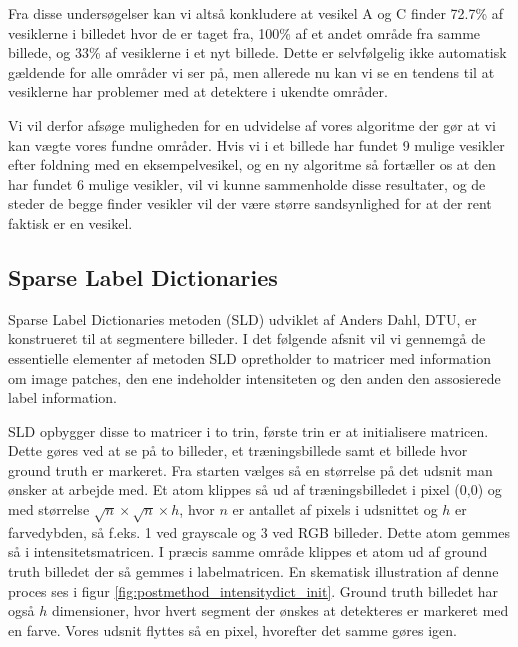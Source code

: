 Fra disse undersøgelser kan vi altså konkludere at vesikel A og C finder 72.7\% af vesiklerne i billedet hvor de er taget fra, 100\% af et andet område fra samme billede, og 33\% af vesiklerne i et nyt billede. Dette er selvfølgelig ikke automatisk gældende for alle områder vi ser på, men allerede nu kan vi se en tendens til at vesiklerne har problemer med at detektere i ukendte områder.

Vi vil derfor afsøge muligheden for en udvidelse af vores algoritme der gør at vi kan vægte vores fundne områder. Hvis vi i et billede har fundet 9 mulige vesikler efter foldning med en eksempelvesikel, og en ny algoritme så fortæller os at den har fundet 6 mulige vesikler, vil vi kunne sammenholde disse resultater, og de steder de begge finder vesikler vil der være større sandsynlighed for at der rent faktisk er en vesikel.

\subsection{Sparse Label Dictionaries}	%

Sparse Label Dictionaries metoden (SLD) udviklet af Anders Dahl, DTU, er konstrueret til at segmentere billeder\cite{sld}. I det følgende afsnit vil vi gennemgå de essentielle elementer af metoden 
SLD opretholder to matricer med information om image patches, den ene indeholder intensiteten og den anden den assosierede label information.

SLD opbygger disse to matricer i to trin, første trin er at initialisere matricen. Dette gøres ved at se på to billeder, et træningsbillede samt et billede hvor ground truth er markeret. Fra starten vælges så en størrelse på det udsnit man ønsker at arbejde med. Et atom klippes så ud af træningsbilledet i pixel (0,0) og med størrelse $\sqrt{n}\times\sqrt{n}\times h$, hvor $n$ er antallet af pixels i udsnittet og $h$ er farvedybden, så f.eks. 1 ved grayscale og 3 ved RGB billeder. Dette atom gemmes så i intensitetsmatricen. I præcis samme område klippes et atom ud af ground truth billedet der så gemmes i labelmatricen. En skematisk illustration af denne proces ses i figur \ref{fig:postmethod_intensitydict_init}. Ground truth billedet har også $h$ dimensioner, hvor hvert segment der ønskes at detekteres er markeret med en farve. Vores udsnit flyttes så en pixel, hvorefter det samme gøres igen.

